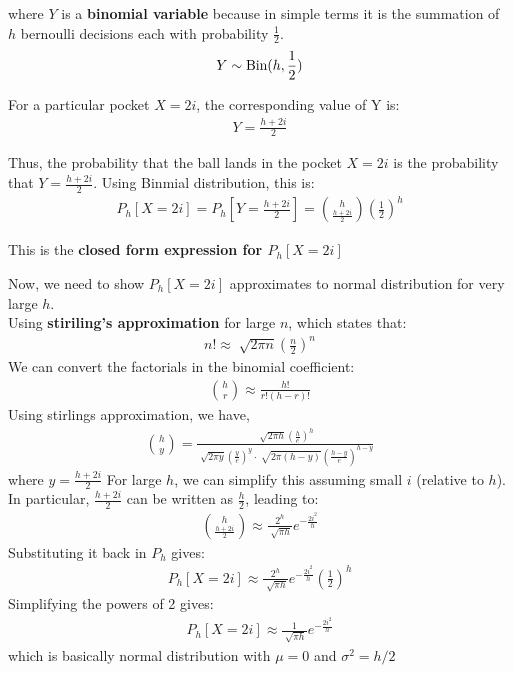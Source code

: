 \begin{solution}
	where $Y$ is a \textbf{binomial variable} because in simple terms it is the summation of $h$ bernoulli decisions each with probability $\frac{1}{2}$.
	\begin{align}
		Y \sim \text{Bin}(h,\frac{1}{2})
	\end{align}

	For a particular pocket $X = 2i$, the corresponding value of Y is:
	\begin{align}
		Y = \frac{h+2i}{2}
	\end{align}

	Thus, the probability that the ball lands in the pocket $X=2i$ is the
	probability that $Y = \frac{h+2i}{2}$. Using Binmial distribution, this
	is:
	\begin{align}
		P_h[X=2i]=P_h\left[Y=\frac{h+2i}{2}\right]=\binom{h}{\frac{h+2i}{2}}\left(\frac{1}{2}\right)^h
	\end{align}

	This is the \textbf{closed form expression for $P_h[X=2i]$}

	Now, we need to show $P_h[X=2i]$ approximates to normal distribution for very large $h$.\\
	Using \textbf{stiriling's approximation} for large $n$, which states that:
	\begin{align}
		n!\approx \sqrt[]{2\pi n}\left(\frac{n}{2}\right)^n
	\end{align}
	We can convert the factorials in the binomial coefficient:
	\begin{align}
		\binom{h}{r} \approx \frac{h!}{r!(h-r)!}
	\end{align}
	Using stirlings approximation, we have,
	\begin{align}
		\binom{h}{y} = \frac{\sqrt[]{2\pi h}\left(\frac{h}{e}\right)^h}{\sqrt[]{2\pi y}\left(\frac{y}{e}\right)^y\cdot \sqrt[]{2\pi(h-y)}\left(\frac{h-y}{e}\right)^{h-y}}
	\end{align}
	where $y = \frac{h+2i}{2}$
	For large $h$, we can simplify this assuming small $i$ (relative to $h$). In particular, $\frac{h+2i}{2}$ can be written as $\frac{h}{2}$, leading to:
	\begin{align}
		\binom{h}{\frac{h+2i}{2}} \approx \frac{2^h}{\sqrt[]{\pi h}}e^{-\frac{2i^2}{h}}
	\end{align}
	Substituting it back in $P_h$ gives:
	\begin{align}
		P_h[X=2i]\approx \frac{2^h}{\sqrt[]{\pi h}}e^{-\frac{2i^2}{h}}\left(\frac{1}{2}\right)^h
	\end{align}
	Simplifying the powers of 2 gives:
	\begin{align}
		P_h[X=2i]\approx \frac{1}{\sqrt[]{\pi h}}e^{-\frac{2i^2}{h}}
	\end{align}
	which is basically normal distribution with $\mu = 0$ and $\sigma^2=h/2$
\end{solution}
